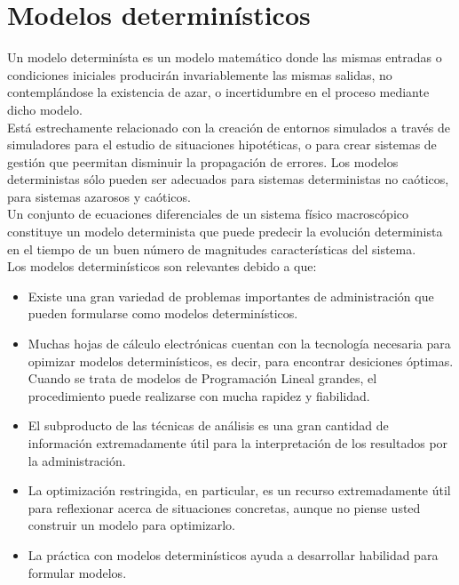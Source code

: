 \documentclass[letterpaper, 12pt]{article}
\begin{document}
    \section{Modelos determinísticos}
    \justify
    Un modelo determinísta es un modelo matemático donde las mismas entradas o condiciones iniciales producirán invariablemente las mismas salidas, no contemplándose la existencia de azar, o incertidumbre en el proceso mediante dicho modelo.
    \\\newline
    Está estrechamente relacionado con la creación de entornos simulados a través de simuladores para el estudio de situaciones hipotéticas, o para crear sistemas de gestión que peermitan disminuir la propagación de errores. Los modelos deterministas sólo pueden
    ser adecuados para sistemas deterministas no caóticos, para sistemas azarosos y caóticos.
    \\\newline
    Un conjunto de ecuaciones diferenciales de un sistema físico macroscópico constituye un modelo determinista que puede predecir la evolución determinista en el tiempo de un buen número de magnitudes características del sistema. 
    \\\newline
    Los modelos determinísticos son relevantes debido a que:
    \begin{itemize}
        \item Existe una gran variedad de problemas importantes de administración que pueden formularse como modelos determinísticos.
        \item Muchas hojas de cálculo electrónicas cuentan con la tecnología necesaria para opimizar modelos determinísticos, es decir, para encontrar desiciones óptimas. Cuando se trata de modelos de Programación Lineal grandes, el procedimiento puede realizarse con mucha rapidez y fiabilidad.
        \item El subproducto de las técnicas de análisis es una gran cantidad de información extremadamente útil para la interpretación de los resultados por la administración.
        \item La optimización restringida, en particular, es un recurso extremadamente útil para reflexionar acerca de situaciones concretas, aunque no piense usted construir un modelo para optimizarlo.
        \item La práctica con modelos determinísticos ayuda a desarrollar habilidad para formular modelos.
    \end{itemize}
\end{document}
